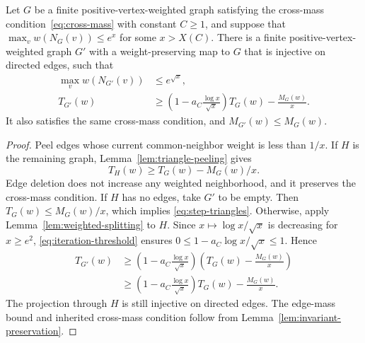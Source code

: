\begin{proposition}\label{prop:neighborhood-reduction}
Let $G$ be a finite positive-vertex-weighted graph satisfying the
cross-mass condition~\eqref{eq:cross-mass} with constant $C\ge1$, and suppose that
$\max_vw(N_G(v))\le e^x$ for some $x>X(C)$. There is a finite
positive-vertex-weighted graph $G'$ with a weight-preserving map to
$G$ that is injective on directed edges, such that
\begin{align}
 \max_vw(N_{G'}(v))&\le e^{\sqrt x},\label{eq:step-neighborhood}\\
 T_{G'}(w)&\ge
 \left(1-a_C\frac{\log x}{\sqrt x}\right)T_G(w)
       -\frac{M_G(w)}x.\label{eq:step-triangles}
\end{align}
It also satisfies the same cross-mass condition, and $M_{G'}(w)\le M_G(w)$.
\end{proposition}

\begin{proof}
Peel edges whose current common-neighbor weight is less than $1/x$.
If $H$ is the remaining graph, Lemma~\ref{lem:triangle-peeling} gives
\[
 T_H(w)\ge T_G(w)-M_G(w)/x.
\]
Edge deletion does not increase any weighted neighborhood, and it
preserves the cross-mass condition. If $H$ has no edges, take $G'$ to
be empty. Then $T_G(w)\le M_G(w)/x$, which implies
\eqref{eq:step-triangles}.
Otherwise, apply Lemma~\ref{lem:weighted-splitting} to $H$.
Since $x\mapsto\log x/\sqrt x$ is decreasing for $x\ge e^2$,
\eqref{eq:iteration-threshold} ensures
$0\le1-a_C\log x/\sqrt x\le1$. Hence
\begin{align*}
 T_{G'}(w)
 &\ge\left(1-a_C\frac{\log x}{\sqrt x}\right)
           \left(T_G(w)-\frac{M_G(w)}x\right)\\
 &\ge\left(1-a_C\frac{\log x}{\sqrt x}\right)T_G(w)
           -\frac{M_G(w)}x.
\end{align*}
The projection through $H$ is still injective on directed edges.
The edge-mass bound and inherited cross-mass condition follow from
Lemma~\ref{lem:invariant-preservation}.
\end{proof}

